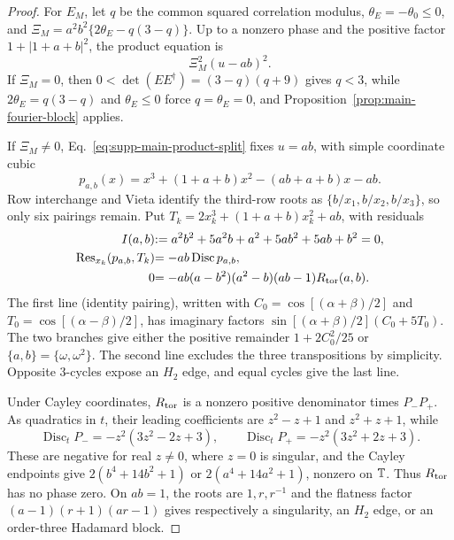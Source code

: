\begin{proof}
{For $E_M$, let $q$ be the common squared correlation modulus, $\theta_E=-\theta_0\le0$, and $\Xi_M=a^2b^2\{2\theta_E-q(3-q)\}$.  Up to a nonzero phase and the positive factor $1+|1+a+b|^2$, the product equation is}
\begin{equation}
{\Xi_M^2(u-ab)^2.}
\label{eq:supp-main-product-split}
\end{equation}
{If $\Xi_M=0$, then $0<\det(EE^\dagger)=(3-q)(q+9)$ gives $q<3$, while $2\theta_E=q(3-q)$ and $\theta_E\le0$ force $q=\theta_E=0$, and Proposition~\ref{prop:main-fourier-block} applies.}

{If $\Xi_M\ne0$, Eq.~\eqref{eq:supp-main-product-split} fixes $u=ab$, with simple coordinate cubic}
\begin{equation}
{p_{a,b}(x)=x^3+(1+a+b)x^2-(ab+a+b)x-ab.}
\label{eq:supp-main-coordinate-cubic}
\end{equation}
{Row interchange and Vieta identify the third-row roots as $\{b/x_1,b/x_2,b/x_3\}$, so only six pairings remain. Put $T_k=2x_k^3+(1+a+b)x_k^2+ab$, with residuals}
\begin{align}
{I(a,b)}&{:=a^2b^2+5a^2b+a^2+5ab^2+5ab+b^2=0,}
\label{eq:supp-main-identity-pairing}
\\
{\operatorname{Res}_{x_k}(p_{a,b},T_k)}&{=-ab\operatorname{Disc}p_{a,b},}
\\
{0}&{=-ab(a-b^2)(a^2-b)(ab-1)R_{\rm tor}(a,b).}
\label{eq:supp-main-pairing-resultant}
\end{align}
{The first line (identity pairing), written with $C_0=\cos[(\alpha+\beta)/2]$ and $T_0=\cos[(\alpha-\beta)/2]$, has imaginary factors $\sin[(\alpha+\beta)/2](C_0+5T_0)$. The two branches give either the positive remainder $1+2C_0^2/25$ or $\{a,b\}=\{\omega,\omega^2\}$.  The second line excludes the three transpositions by simplicity. Opposite $3$-cycles expose an $H_2$ edge, and equal cycles give the last line.}

{Under Cayley coordinates, $R_{\rm tor}$ is a nonzero positive denominator times $P_-P_+$. As quadratics in $t$, their leading coefficients are $z^2-z+1$ and $z^2+z+1$, while}
\begin{equation}
{\operatorname{Disc}_tP_-= -z^2(3z^2-2z+3),
\qquad
\operatorname{Disc}_tP_+= -z^2(3z^2+2z+3).}
\end{equation}
{These are negative for real $z\ne0$, where $z=0$ is singular, and the Cayley endpoints give $2(b^4+14b^2+1)$ or $2(a^4+14a^2+1)$, nonzero on $\mathbb T$. Thus $R_{\rm tor}$ has no phase zero.  On $ab=1$, the roots are $1,r,r^{-1}$ and the flatness factor $(a-1)(r+1)(ar-1)$ gives respectively a singularity, an $H_2$ edge, or an order-three Hadamard block.}


\end{proof}
